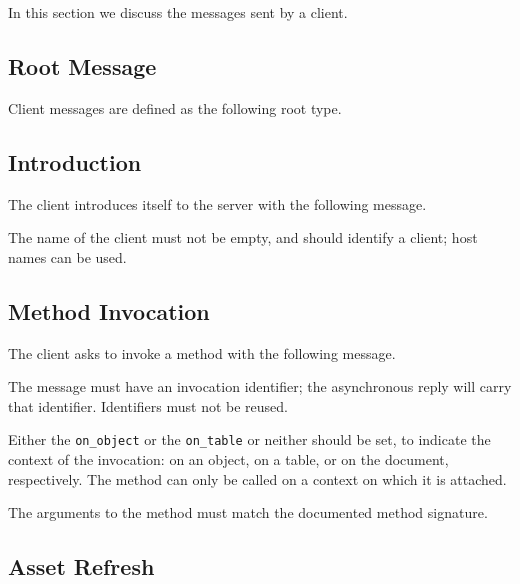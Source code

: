 \documentclass[11pt, oneside]{amsart}
\begin{document}
In this section we discuss the messages sent by a client.

\subsection{Root Message}

Client messages are defined as the following root type.



\subsection{Introduction}

The client introduces itself to the server with the following message.



The name of the client must not be empty, and should identify a client; host names can be used.

\subsection{Method Invocation}
\label{sec:method_invoke}

The client asks to invoke a method with the following message.



The message must have an invocation identifier; the asynchronous reply will carry that identifier. Identifiers must not be reused.

Either the \texttt{on\_object} or the \texttt{on\_table} or neither should be set, to indicate the context of the invocation: on an object, on a table, or on the document, respectively. The method can only be called on a context on which it is attached.

The arguments to the method must match the documented method signature.

\subsection{Asset Refresh}
\label{sec:refresh_message}
\end{document}
